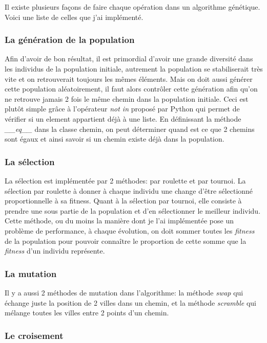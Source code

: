 \documentclass[12pt]{article}
\begin{document}
Il existe plusieurs façons de faire chaque opération dans un algorithme génétique. Voici une liste de celles que j'ai
implémenté.

\subsubsection{La génération de la population}

Afin d'avoir de bon résultat, il est primordial d'avoir une grande diversité dans les individus de la population initiale,
autrement la population se stabiliserait très vite et on retrouverait toujours les mêmes éléments.
Mais on doit aussi générer cette population aléatoirement, il faut alors contrôler cette génération afin qu'on ne retrouve
jamais 2 fois le même chemin dans la population initiale. Ceci est plutôt simple grâce à l'opérateur \emph{not in}
proposé par Python qui permet de vérifier si un element appartient déjà à une liste. En définissant la méthode \emph{\_\_eq\_\_}
dans la classe chemin, on peut déterminer quand est ce que 2 chemins sont égaux et ainsi savoir si un chemin existe déjà dans
la population.

\subsubsection{La sélection}

La sélection est implémentée par 2 méthodes: par roulette et par tournoi. La sélection par
roulette à donner à chaque individu une change d'être sélectionné proportionnelle à sa
fitness. Quant à la sélection par tournoi, elle consiste à prendre une sous partie
de la population et d'en sélectionner le meilleur individu. Cette méthode, ou du moins la manière dont je l'ai
implémentée pose un problème de performance, à chaque évolution, on doit sommer toutes les \emph{fitness} de la population
pour pouvoir connaître le proportion de cette somme que la \emph{fitness} d'un individu représente.

\subsubsection{La mutation}

Il y a aussi 2 méthodes de mutation dans l'algorithme: la méthode \emph{swap} qui échange juste
la position de 2 villes dans un chemin, et la méthode \emph{scramble} qui mélange toutes les villes
entre 2 points d'un chemin.

\subsubsection{Le croisement}
\end{document}
